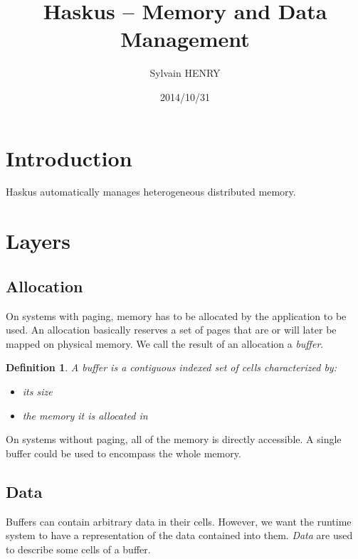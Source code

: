 \documentclass[twocolumn]{article}
\begin{document}
\title{Haskus -- Memory and Data Management}
\author{Sylvain HENRY}
\date{2014/10/31}

\newtheorem{defin}{Definition}

\maketitle

\section{Introduction}

Haskus automatically manages heterogeneous distributed memory.

\section{Layers}

\subsection{Allocation}

On systems with paging, memory has to be allocated by the application to be
used. An allocation basically reserves a set of pages that are or will later be
mapped on physical memory. We call the result of an allocation a \emph{buffer}.

\begin{defin}
A \emph{buffer} is a contiguous indexed set of cells characterized by:
\begin{itemize}
   \item its size
   \item the memory it is allocated in
\end{itemize}
\end{defin}

On systems without paging, all of the memory is directly accessible. A single
buffer could be used to encompass the whole memory.

\subsection{Data}

Buffers can contain arbitrary data in their cells. However, we want the runtime
system to have a representation of the data contained into them. \emph{Data} are
used to describe some cells of a buffer.
\end{document}
